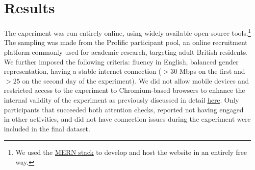 \documentclass[11pt,a4paper,oneside]{article}
\begin{document}




\section{Results}

The experiment was run entirely online, using widely available open-source tools.\footnote{We used the \href{https://www.mongodb.com/languages/mern-stack-tutorial}{MERN stack} to develop and host the website in an entirely free way.} The sampling was made from the Prolific participant pool, an online recruitment platform commonly used for academic research, targeting adult British residents. We further imposed the following criteria: fluency in English, balanced gender representation, having a stable internet connection ($>30$ Mbps on the first and $>25$ on the second day of the experiment). We did not allow  mobile devices and restricted access to the experiment to Chromium-based browsers to enhance the internal validity of the experiment as previously discussed in detail \hyperref[int-val]{here}. Only participants that succeeded both attention checks, reported not having engaged in other activities, and did not have connection issues during the experiment were included in the final dataset.
\end{document}
